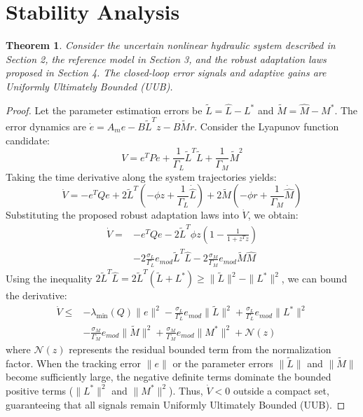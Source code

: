 \documentclass[12pt,a4paper]{article}
\newtheorem{theorem}{Theorem}
\begin{document}
\section{Stability Analysis}
\begin{theorem}
Consider the uncertain nonlinear hydraulic system described in Section 2, the reference model in Section 3, and the robust adaptation laws proposed in Section 4. The closed-loop error signals and adaptive gains are Uniformly Ultimately Bounded (UUB).
\end{theorem}
\begin{proof}
Let the parameter estimation errors be $\tilde{L} = \hat{L} - L^*$ and $\tilde{M} = \hat{M} - M^*$. The error dynamics are $\dot{e} = A_m e - B \tilde{L}^T z - B \tilde{M} r$. Consider the Lyapunov function candidate:
\begin{equation}
    V = e^T P e + \frac{1}{\Gamma_L} \tilde{L}^T \tilde{L} + \frac{1}{\Gamma_M} \tilde{M}^2
\end{equation}
Taking the time derivative along the system trajectories yields:
\begin{equation}
    \dot{V} = -e^T Q e + 2 \tilde{L}^T \left( -\phi z + \frac{1}{\Gamma_L} \dot{\hat{L}} \right) + 2 \tilde{M} \left( -\phi r + \frac{1}{\Gamma_M} \dot{\hat{M}} \right)
\end{equation}
Substituting the proposed robust adaptation laws into $\dot{V}$, we obtain:
\begin{align*}
    \dot{V} = &-e^T Q e - 2 \tilde{L}^T \phi z \left( 1 - \frac{1}{1+z^T z} \right) \\
    &- 2 \frac{\sigma_L}{\Gamma_L} e_{mod} \tilde{L}^T \hat{L} - 2 \frac{\sigma_M}{\Gamma_M} e_{mod} \tilde{M} \hat{M}
\end{align*}
Using the inequality $2 \tilde{L}^T \hat{L} = 2 \tilde{L}^T (\tilde{L} + L^*) \ge \|\tilde{L}\|^2 - \|L^*\|^2$, we can bound the derivative:
\begin{align*}
    \dot{V} \le &-\lambda_{\min}(Q) \|e\|^2 - \frac{\sigma_L}{\Gamma_L} e_{mod} \|\tilde{L}\|^2 + \frac{\sigma_L}{\Gamma_L} e_{mod} \|L^*\|^2 \\
    &- \frac{\sigma_M}{\Gamma_M} e_{mod} \|\tilde{M}\|^2 + \frac{\sigma_M}{\Gamma_M} e_{mod} \|M^*\|^2 + \mathcal{N}(z)
\end{align*}
where $\mathcal{N}(z)$ represents the residual bounded term from the normalization factor. When the tracking error $\|e\|$ or the parameter errors $\|\tilde{L}\|$ and $\|\tilde{M}\|$ become sufficiently large, the negative definite terms dominate the bounded positive terms ($\|L^*\|^2$ and $\|M^*\|^2$). Thus, $\dot{V} < 0$ outside a compact set, guaranteeing that all signals remain Uniformly Ultimately Bounded (UUB).
\end{proof}
\end{document}
